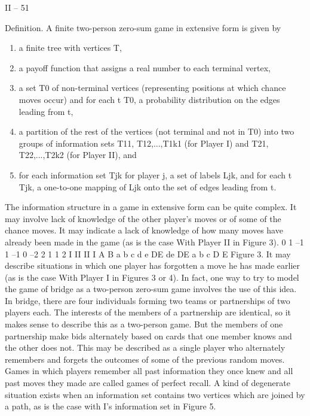II – 51
\begin{framed}
Definition. A finite two-person zero-sum game in extensive form is given by
\begin{enumerate}
\item a finite tree with vertices T,
\item a payoff function that assigns a real number to each terminal vertex,
\item a set T0 of non-terminal vertices (representing positions at which chance moves
occur) and for each t \in T0, a probability distribution on the edges leading from t,
\item a partition of the rest of the vertices (not terminal and not in T0) into two groups
of information sets T11, T12,...,T1k1 (for Player I) and T21, T22,...,T2k2 (for Player II),
and
\item for each information set Tjk for player j, a set of labels Ljk, and for each t \in Tjk,
a one-to-one mapping of Ljk onto the set of edges leading from t.
\end{enumerate}
\end{framed}
The information structure in a game in extensive form can be quite complex. It may
involve lack of knowledge of the other player’s moves or of some of the chance moves. It
may indicate a lack of knowledge of how many moves have already been made in the game
(as is the case With Player II in Figure 3).
0
1 –1 1 –1 0 –2 2 1
1 2
I
II II
I
A B
a b c d
e
DE de DE a b c
D E
Figure 3.
It may describe situations in which one player has forgotten a move he has made
earlier (as is the case With Player I in Figures 3 or 4). In fact, one way to try to model
the game of bridge as a two-person zero-sum game involves the use of this idea. In bridge,
there are four individuals forming two teams or partnerships of two players each. The
interests of the members of a partnership are identical, so it makes sense to describe this
as a two-person game. But the members of one partnership make bids alternately based
on cards that one member knows and the other does not. This may be described as a
single player who alternately remembers and forgets the outcomes of some of the previous
random moves. Games in which players remember all past information they once knew
and all past moves they made are called games of perfect recall.
A kind of degenerate situation exists when an information set contains two vertices
which are joined by a path, as is the case with I’s information set in Figure 5.
